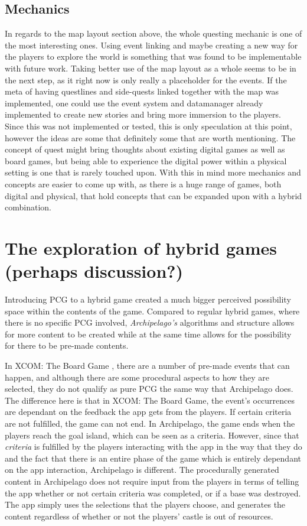 \subsection{Mechanics}
In regards to the map layout section above, the whole questing mechanic is one of the most interesting ones. Using event linking and maybe creating a new way for the players to explore the world is something that was found to be implementable with future work. Taking better use of the map layout as a whole seems to be in the next step, as it right now is only really a placeholder for the events. If the meta of having questlines and side-quests linked together with the map was implemented, one could use the event system and datamanager already implemented to create new stories and bring more immersion to the players. Since this was not implemented or tested, this is only speculation at this point, however the ideas are some that definitely some that are worth mentioning. The concept of quest might bring thoughts about existing digital games as well as board games, but being able to experience the digital power within a physical setting is one that is rarely touched upon. With this in mind more mechanics and concepts are easier to come up with, as there is a huge range of games, both digital and physical, that hold concepts that can be expanded upon with a hybrid combination.

\section{The exploration of hybrid games (perhaps discussion?)}
Introducing PCG to a hybrid game created a much bigger perceived possibility space within the contents of the game. Compared to regular hybrid games, where there is no specific PCG involved, \textit{Archipelago's} algorithms and structure allows for more content to be created while at the same time allows for the possibility for there to be pre-made contents. 

In XCOM: The Board Game \cite{game:xcomtbg}, there are a number of pre-made events that can happen, and although there are some procedural aspects to how they are selected, they do not qualify as pure PCG the same way that Archipelago does. The difference here is that in XCOM: The Board Game, the event's occurrences are dependant on the feedback the app gets from the players. If certain criteria are not fulfilled, the game can not end. In Archipelago, the game ends when the players reach the goal island, which can be seen as a criteria. However, since that \textit{criteria} is fulfilled by the players interacting with the app in the way that they do and the fact that there is an entire phase of the game which is entirely dependant on the app interaction, Archipelago is different. The procedurally generated content in Archipelago does not require input from the players in terms of telling the app whether or not certain criteria was completed, or if a base was destroyed. The app simply uses the selections that the players choose, and generates the content regardless of whether or not the players' castle is out of resources.

